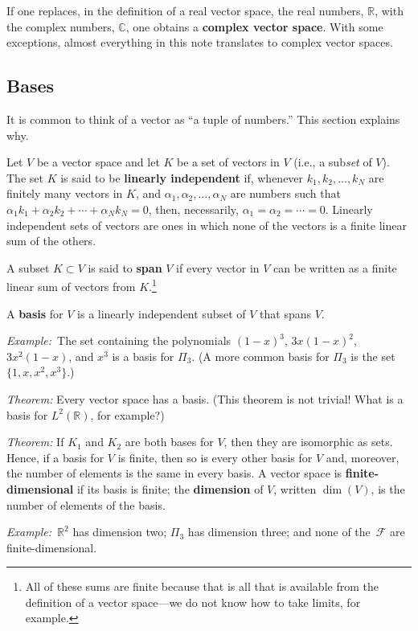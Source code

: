 \documentclass[10pt, a4paper, twocolumn]{article}
\newcommand{\R}{\mathbb{R}}
\newcommand{\defn}[1]{\textbf{#1}}
\newcommand{\eg}{\emph{Example:}\relax}
\DeclareMathOperator{\dimension}{dim}
\begin{document}
If one replaces, in the definition of a real vector space, the real numbers,
$\R$, with the complex numbers, $\mathbb{C}$, one obtains a \defn{complex vector
  space}. With some exceptions, almost everything in this note translates to
complex vector spaces.


\subsection{Bases}

It is common to think of a vector as “a tuple of numbers.” This section explains
why.

Let $V$ be a vector space and let $K$ be a set of vectors in $V$ (i.e., a
sub\emph{set} of $V$). The set $K$ is said to be \defn{linearly independent} if,
whenever $k_1, k_2, \dotsc, k_N$ are finitely many vectors in $K$, and $\alpha_1,
\alpha_2, \dotsc, \alpha_N$ are numbers such that $\alpha_1 k_1 + \alpha_2 k_2 + \dotsb + \alpha_N k_N =
0$, then, necessarily, $\alpha_1 = \alpha_2 = \dotsb = 0$. Linearly independent sets of
vectors are ones in which none of the vectors is a finite linear sum of the
others.

A subset $K \subset V$ is said to \defn{span} $V$ if every vector in $V$ can be
written as a finite linear sum of vectors from $K$.\footnote{All of these sums
  are finite because that is all that is available from the definition of a
  vector space---we do not know how to take limits, for example.}

A \defn{basis} for $V$ is a linearly independent subset of $V$ that spans $V$. 

\eg\ The set containing the polynomials $(1-x)^3$, $3x(1-x)^2$, $3x^2(1-x)$, and
$x^3$ is a basis for $\Pi_3$. (A more common basis for $\Pi_3$ is the set $\{1, x,
x^2, x^3\}$.)

\emph{Theorem:} Every vector space has a basis. (This theorem is not trivial!
What is a basis for $L^2(\R)$, for example?)

\emph{Theorem:} If $K_1$ and $K_2$ are both bases for $V$, then they are
isomorphic as sets. Hence, if a basis for $V$ is finite, then so is every other
basis for $V$ and, moreover, the number of elements is the same in every
basis. A vector space is \defn{finite-dimensional} if its basis is finite; the
\defn{dimension} of $V$, written $\dimension(V)$, is the number of elements of
the basis.

\eg\ $\R^2$ has dimension two; $\Pi_3$ has dimension three; and none of
the~$\mathcal{F}$ are finite-dimensional.
\end{document}
